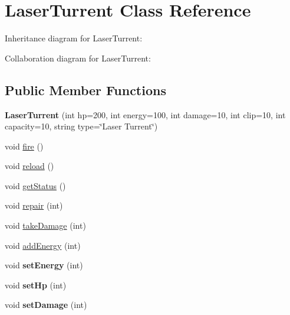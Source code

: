 \hypertarget{classLaserTurrent}{}\section{Laser\+Turrent Class Reference}
\label{classLaserTurrent}


Inheritance diagram for Laser\+Turrent\+:


Collaboration diagram for Laser\+Turrent\+:
\subsection*{Public Member Functions}
\begin{DoxyCompactItemize}
\item 
\mbox{\label{classLaserTurrent_a0b45501f233d10cf9a3661d5ef43d916}} 
{\bfseries Laser\+Turrent} (int hp=200, int energy=100, int damage=10, int clip=10, int capacity=10, string type=\char`\"{}Laser Turrent\char`\"{})
\item 
void \hyperlink{classLaserTurrent_a227605641777e0db08eea85d1885f50d}{fire} ()
\item 
void \hyperlink{classLaserTurrent_a32707d7fea4474e0dabf6508adbb3f5b}{reload} ()
\item 
void \hyperlink{classLaserTurrent_a46a81e0670b7a095307f34032253ad2c}{get\+Status} ()
\item 
void \hyperlink{classLaserTurrent_a8cb483c6f5659ebca912c8e0cb5ba1f2}{repair} (int)
\item 
void \hyperlink{classLaserTurrent_a8f84af30ae6040de5c5d291dc890d804}{take\+Damage} (int)
\item 
void \hyperlink{classLaserTurrent_a391a30b071f67e22a3b89800cafeb2ac}{add\+Energy} (int)
\item 
\mbox{\label{classLaserTurrent_a2767302e4e44834f878fb4eff750a8df}} 
void {\bfseries set\+Energy} (int)
\item 
\mbox{\label{classLaserTurrent_a6a71cc5deb37b8d8560a467a9cdc18a7}} 
void {\bfseries set\+Hp} (int)
\item 
\mbox{\label{classLaserTurrent_a598882895f3aa97d83356ed63a1e8633}} 
void {\bfseries set\+Damage} (int)
\item 
\mbox{\label{classLaserTurrent_ada2bdadca8f752d1caf3e3004c228d0d}} 

\end{DoxyCompactItemize}
